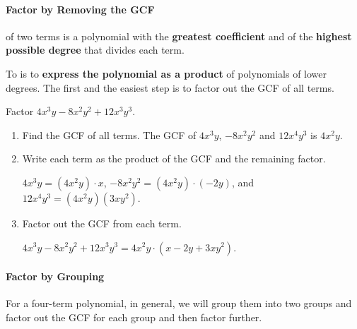 
\paragraph*{Factor by Removing the GCF}
	 of two terms is a polynomial with the \textbf{greatest coefficient} and of the \textbf{highest possible degree} that divides each term.

	To  is to \textbf{express the polynomial as a product} of polynomials of lower degrees. The first and the easiest step is to factor out the GCF of all terms.
	\begin{example}
		Factor $4x^3y-8x^2y^2+12x^3y^3$.
	\end{example}
	\begin{solution}
		\begin{enumerate}[label={\textbf{\textup{Step \arabic*.}}~}]
			\item Find the GCF of all terms.  The GCF of $4x^3y$, $-8x^2y^2$ and $12x^4y^3$ is $4x^2y$.
			\item Write each term as the product of the GCF and the remaining factor.\\
			      \centerline{$4x^3y=(4x^2y)\cdot x$, $-8x^2y^2=(4x^2y)\cdot (-2y)$, and $12x^4y^3=(4x^2y)(3xy^2)$.}

			\item Factor out the GCF from each term.\\
			      \centerline{$4x^3y-8x^2y^2+12x^3y^3=4x^2y\cdot(x-2y+3xy^2)$.}
		\end{enumerate}
	\end{solution}


\paragraph*{Factor by Grouping}
	For a four-term polynomial, in general, we will group them into two groups and factor out the GCF for each group and then factor further.

